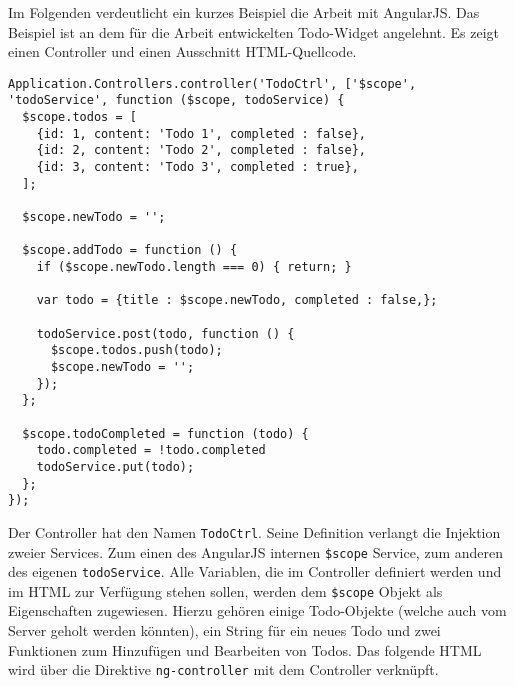 Im Folgenden verdeutlicht ein kurzes Beispiel die Arbeit mit AngularJS. Das Beispiel ist an dem für die Arbeit entwickelten Todo-Widget angelehnt. Es zeigt einen Controller und einen Ausschnitt HTML-Quellcode.

\begin{lstlisting}
Application.Controllers.controller('TodoCtrl', ['$scope', 'todoService', function ($scope, todoService) {
  $scope.todos = [
    {id: 1, content: 'Todo 1', completed : false},
    {id: 2, content: 'Todo 2', completed : false},
    {id: 3, content: 'Todo 3', completed : true},
  ];
  
  $scope.newTodo = '';

  $scope.addTodo = function () {
    if ($scope.newTodo.length === 0) { return; }

    var todo = {title : $scope.newTodo, completed : false,};

    todoService.post(todo, function () {
      $scope.todos.push(todo);
      $scope.newTodo = '';
    });
  };
  
  $scope.todoCompleted = function (todo) {
    todo.completed = !todo.completed
    todoService.put(todo);
  };
});
\end{lstlisting}
Der Controller hat den Namen \texttt{TodoCtrl}. Seine Definition verlangt die Injektion zweier Services. Zum einen des AngularJS internen \texttt{\$scope} Service, zum anderen des eigenen \texttt{todoService}. Alle Variablen, die im Controller definiert werden und im HTML zur Verfügung stehen sollen, werden dem \texttt{\$scope} Objekt als Eigenschaften zugewiesen. Hierzu gehören einige Todo-Objekte (welche auch vom Server geholt werden könnten), ein String für ein neues Todo und zwei Funktionen zum Hinzufügen und Bearbeiten von Todos. Das folgende HTML wird über die Direktive \texttt{ng-controller} mit dem Controller verknüpft.

